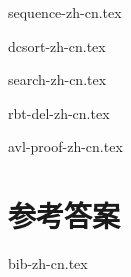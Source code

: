 \documentclass[zihao=5, b5paper, twoside, heading=true, punct=kaiming]{ctexbook}
\begin{document}
{sequence-zh-cn.tex}

{dcsort-zh-cn.tex}

{search-zh-cn.tex}

\backmatter

\appendix
\noappendicestocpagenum
\addappheadtotoc

\renewcommand{\thechapter}{\Alph{chapter}}
\renewcommand{\thesection}{\Roman{section}}
\renewcommand{\thesubsection}{\fnsymbol{subsection}}

{rbt-del-zh-cn.tex}

{avl-proof-zh-cn.tex}


\chapter{参考答案}
\shipoutAnswer

{bib-zh-cn.tex}



\printindex
\end{document}

